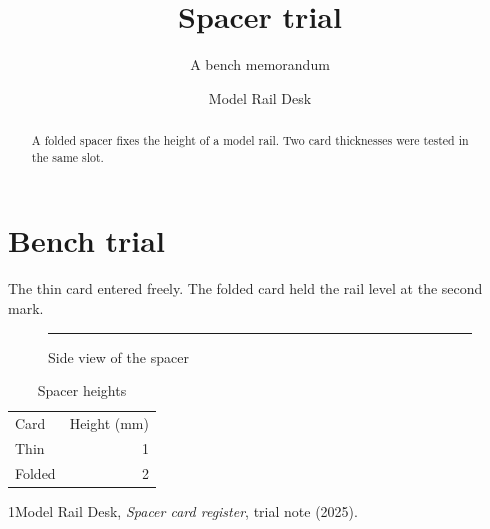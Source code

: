 \documentclass[abstract=true]{scrartcl}
\begin{document}
\title{Spacer trial}\subtitle{A bench memorandum}\author{Model Rail Desk}\publishers{Paper Model Workshop}\date{}\maketitle\begin{abstract}A folded spacer fixes the height of a model rail. Two card thicknesses were tested in the same slot.\end{abstract}
\section{Bench trial}
The thin card entered freely. The folded card held the rail level at the second mark.
\begin{figure}[ht]\centering\rule{28mm}{2mm}\caption{Side view of the spacer}\end{figure}
\begin{table}[ht]\centering\begin{tabular}{lr}Card&Height (mm)\\Thin&1\\Folded&2\end{tabular}\caption{Spacer heights}\end{table}
\begin{thebibliography}{1}Model Rail Desk, \emph{Spacer card register}, trial note (2025).\end{thebibliography}
\end{document}
